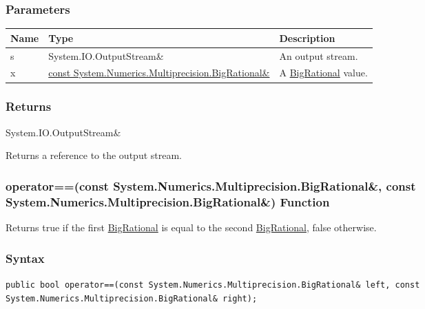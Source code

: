 \documentclass[a4paper,oneside,11.000000pt]{book}
\begin{document}
\subsubsection*{Parameters}
\begin{flushleft}
\begin{supertabular}[l]{!{\raggedright}p{1.30721cm}!{\raggedright}p{8.55945cm}!{\raggedright}p{4.93333cm}}
\textbf{Name}
& \textbf{Type}
& \textbf{Description}
\\
\hline
s
& System.\-IO.\-OutputStream\&\-
& An output stream.

\\
x
& \hyperlink{System.Numerics.Multiprecision.BigRational}{const System.\-Numerics.\-Multiprecision.\-BigRational\&\-}
& A \hyperlink{System.Numerics.Multiprecision.BigRational}{BigRational} value.

\\
\end{supertabular}

\end{flushleft}
\subsubsection*{Returns}System.\-IO.\-OutputStream\&\-
\begin{flushleft}
Returns a reference to the output stream.

\end{flushleft}
\clearpage

\hypertarget{System.Numerics.Multiprecision.operator.equal.C.R.System.Numerics.Multiprecision.BigRational.C.R.System.Numerics.Multiprecision.BigRational}{\subsubsection*{operator==(const System.Numerics.Multiprecision.BigRational\&, const System.Numerics.Multiprecision.BigRational\&) Function}}
\begin{flushleft}
Returns true if the first \hyperlink{System.Numerics.Multiprecision.BigRational}{BigRational} is equal to the second \hyperlink{System.Numerics.Multiprecision.BigRational}{BigRational}, false otherwise.

\end{flushleft}
\subsubsection*{Syntax}
\texttt{public bool operator==(const System.Numerics.Multiprecision.BigRational\& left, const System.Numerics.Multiprecision.BigRational\& right);}
\end{document}

